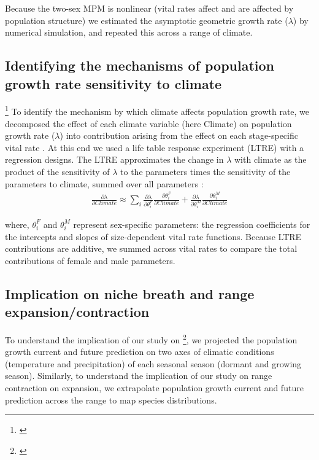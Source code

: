 \documentclass[11pt]{article}
\newcommand{\tom}[2]{{\color{red}{#1}}\footnote{\textit{\color{red}{#2}}}}
\begin{document}
{Because the two-sex MPM is nonlinear (vital rates affect and are affected by population structure) we estimated the asymptotic geometric growth rate ($\lambda$) by numerical simulation, and repeated this across a range of climate.

\subsection*{Identifying the mechanisms of population growth rate sensitivity to climate }
\tom{}{I don't think the LTRE analysis is adequately motivated by the Intro.}
To identify the mechanism by which climate affects population growth rate, we decomposed the effect of each climate variable (here Climate) on population growth rate ($\lambda$) into contribution arising from the effect on each stage-specific vital rate \citep{caswell2000matrix}.
At this end we used a life table response experiment (LTRE) with a regression designs. 
The LTRE approximates the change in $\lambda$ with climate  as the product of the sensitivity of $\lambda$ to the parameters times the sensitivity of the parameters to climate, summed over all parameters \citep{caswell1989analysis}:
\begin{align}\label{eq:ltre}
\frac{\partial \lambda}{\partial Climate} \approx \sum_{i} \frac{\partial \lambda}{\partial \theta^{F}_{i}} \frac{\partial \theta^{F}_{i}}{\partial Climate} + \frac{\partial \lambda}{\partial \theta^{M}_{i}} \frac{\partial \theta^{M}_{i}}{\partial Climate}
\end{align}

\noindent where, $\theta^{F}_{i}$ and $\theta^{M}_{i}$ represent sex-specific parameters: the regression coefficients for the intercepts and slopes of size-dependent vital rate functions. 
Because LTRE contributions are additive, we summed across vital rates to compare the total contributions of female and male parameters. 

\subsection*{Implication on niche breath and range expansion/contraction}
To understand the implication of our study on \tom{niche breath}{You have not defined this, or described how it relates to geographic ranges.}, we projected the population growth current and future prediction on two axes of climatic conditions (temperature and precipitation) of each seasonal season (dormant and growing season). 
Similarly, to understand the implication of our study on range contraction on expansion, we extrapolate population growth current and future prediction across the range to map species distributions. 

}
\end{document}
